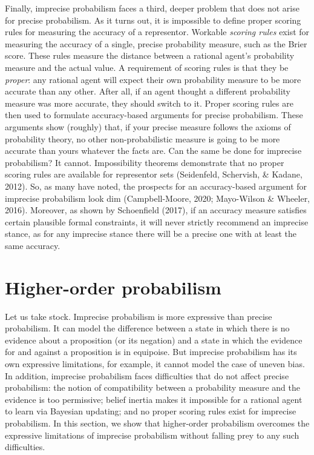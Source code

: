 \documentclass[
  letterpaper,
  DIV=11,
  numbers=noendperiod]{scrartcl}
\begin{document}
Finally, imprecise probabilism faces a third, deeper problem that does
not arise for precise probabilism. As it turns out, it is impossible to
define proper scoring rules for measuring the accuracy of a representor.
Workable \emph{scoring rules} exist for measuring the accuracy of a
single, precise probability measure, such as the Brier score. These
rules measure the distance between a rational agent's probability
measure and the actual value. A requirement of scoring rules is that
they be \emph{proper}: any rational agent will expect their own
probability measure to be more accurate than any other. After all, if an
agent thought a different probability measure was more accurate, they
should switch to it. Proper scoring rules are then used to formulate
accuracy-based arguments for precise probabilism. These arguments show
(roughly) that, if your precise measure follows the axioms of
probability theory, no other non-probabilistic measure is going to be
more accurate than yours whatever the facts are. Can the same be done
for imprecise probabilism? It cannot. Impossibility theorems demonstrate
that no proper scoring rules are available for representor sets
(Seidenfeld, Schervish, \& Kadane, 2012). So, as many have noted, the
prospects for an accuracy-based argument for imprecise probabilism look
dim (Campbell-Moore, 2020; Mayo-Wilson \& Wheeler, 2016). Moreover, as
shown by Schoenfield (2017), if an accuracy measure satisfies certain
plausible formal constraints, it will never strictly recommend an
imprecise stance, as for any imprecise stance there will be a precise
one with at least the same accuracy.

\hypertarget{higher-order-probabilism}{%
\section{Higher-order probabilism}\label{higher-order-probabilism}}

\label{sec:higher-order}

Let us take stock. Imprecise probabilism is more expressive than precise
probabilism. It can model the difference between a state in which there
is no evidence about a proposition (or its negation) and a state in
which the evidence for and against a proposition is in equipoise. But
imprecise probabilism has its own expressive limitations, for example,
it cannot model the case of uneven bias. In addition, imprecise
probabilism faces difficulties that do not affect precise probabilism:
the notion of compatibility between a probability measure and the
evidence is too permissive; belief inertia makes it impossible for a
rational agent to learn via Bayesian updating; and no proper scoring
rules exist for imprecise probabilism. In this section, we show that
higher-order probabilism overcomes the expressive limitations of
imprecise probabilism without falling prey to any such difficulties.
\end{document}
